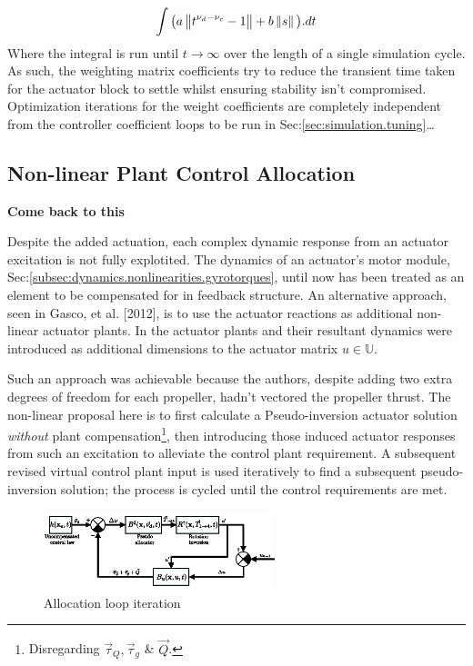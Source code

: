\begin{equation}\label{eq:actuator-penalty}
\int \big(a\left\lVert t^{\nu_d-\nu_c}-1\right\rVert+b\left\lVert s\right\rVert\big).dt
\end{equation}
Where the integral is run until $t\rightarrow\infty$ over the length of a single simulation cycle. As such, the weighting matrix coefficients try to reduce the transient time taken for the actuator block to settle whilst ensuring stability isn't compromised. Optimization iterations for the weight coefficients are completely independent from the controller coefficient loops to be run in Sec:\ref{sec:simulation.tuning}\ldots
\subsection{Non-linear Plant Control Allocation}
\label{subsec:control.allocation.nonlinear}
\textbf{Come back to this}
\par
Despite the added actuation, each complex dynamic response from an actuator excitation is not fully explotited. The dynamics of an actuator's motor module, Sec:\ref{subsec:dynamics.nonlinearities.gyrotorques}, until now has been treated as an element to be compensated for in feedback structure. An alternative approach, seen in Gasco, et al. [2012]\cite{tiltgasco,tiltrihani}, is to use the actuator reactions as additional non-linear actuator plants. In \cite{tiltgasco,tiltrihani} the actuator plants and their resultant dynamics were introduced as additional dimensions to the actuator matrix $u\in\mathbb{U}$. 
\par
Such an approach was achievable because the authors, despite adding two extra degrees of freedom for each propeller, hadn't vectored the propeller thrust. The non-linear proposal here is to first calculate a Pseudo-inversion actuator solution \emph{without} plant compensation\footnote{Disregarding $\vec{\tau}_Q,\vec{\tau}_g$ \& $\vec{Q}$.}, then introducing those induced actuator responses from such an excitation to alleviate the control plant requirement. A subsequent revised virtual control plant input is used iteratively to find a subsequent pseudo-inversion solution; the process is cycled until the control requirements are met.
\par
\begin{figure}[hbtp]
\centering
\includegraphics[width=0.6\textwidth]{figs/allocation}
\caption{Allocation loop iteration}
\label{fig:non-linear-allocation}
\end{figure}
